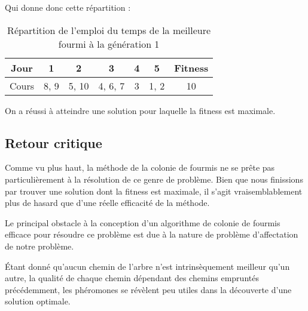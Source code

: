 Qui donne donc cette répartition :

\begin{table}[!h]
    \centering
    \begin{tabular}{|c|c|c|c|c|c|c|}
        \hline
        Jour  & 1    & 2     & 3       & 4 & 5    & Fitness \\
        \hline
        Cours & 8, 9 & 5, 10 & 4, 6, 7 & 3 & 1, 2 & 10      \\
        \hline
    \end{tabular}
    \caption{Répartition de l'emploi du temps de la meilleure fourmi à la génération 1}\label{tab:fourmi-finale}
\end{table}

On a réussi à atteindre une solution pour laquelle la fitness est maximale.


\subsection{Retour critique}\label{subsec:retour-critique}

Comme vu plus haut, la méthode de la colonie de fourmis ne se prête pas particulièrement à la résolution de ce genre de problème.
Bien que nous finissions par trouver une solution dont la fitness est maximale, il s'agit vraisemblablement plus de hasard que d'une réelle efficacité de la méthode.

Le principal obstacle à la conception d'un algorithme de colonie de fourmis efficace pour résoudre ce problème est due à la nature de problème d'affectation de notre problème.

Étant donné qu'aucun \og chemin \fg{} de l'arbre n'est intrinsèquement meilleur qu'un autre, la qualité de chaque chemin dépendant des chemins empruntés précédemment, les phéromones se révèlent peu utiles dans la découverte d'une solution optimale.
